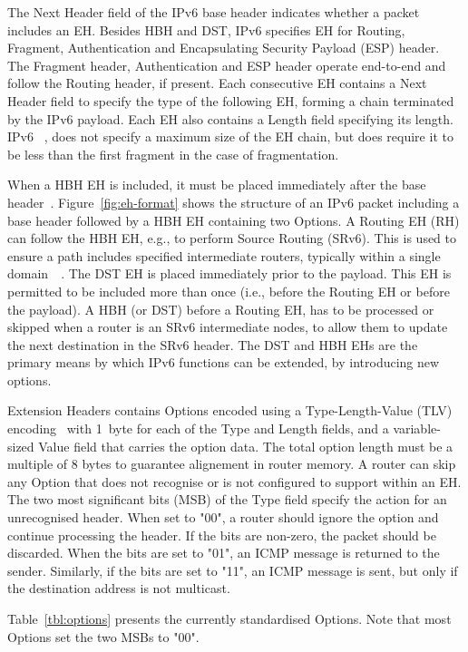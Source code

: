 \documentclass[conference]{IEEEtran}
\begin{document}
The Next Header field of the IPv6 base header indicates whether a packet
includes an EH.  Besides HBH and DST, IPv6 specifies EH for Routing, Fragment,
Authentication and Encapsulating Security Payload (ESP) header.  The Fragment
header, Authentication and ESP header operate end-to-end and follow the Routing
header, if present.  Each consecutive EH contains a Next Header field to
specify the type of the following EH, forming a chain terminated by the IPv6
payload. Each EH also contains a Length field specifying its length.  IPv6
~\cite{RFC8200}, does not specify a maximum size of the EH chain, but does
require it to be less than the first fragment in the case of fragmentation. 

When a HBH EH is included, it must be placed immediately after the base
header~\cite{RFC8200}.  Figure~\ref{fig:eh-format} shows the structure of an
IPv6 packet including a base header followed by a HBH EH containing two
Options.  A Routing EH (RH) can follow the HBH EH, e.g., to perform Source
Routing (SRv6). This is used  to ensure a path includes specified intermediate
routers, typically within a single domain~\cite{srv6}~\cite{srperf}. The DST EH
is placed immediately prior to the payload. This EH is permitted to be included
more than once (i.e.,  before the Routing EH or before the payload).  A HBH (or
DST)  before a Routing EH, has to be processed or skipped when a router is an
SRv6 intermediate nodes, to allow them to update the next destination in the
SRv6 header.  The DST and HBH EHs are the primary means by which IPv6 functions
can be extended, by introducing new options. 

Extension Headers contains Options encoded using a Type-Length-Value (TLV)
encoding~\cite{RFC8200} with 1~byte for each of the Type and Length fields, and
a variable-sized Value field that carries the option data. The total option
length must be a multiple of 8 bytes to guarantee alignement in router memory.
A router can skip any Option that does not recognise or is not configured to
support within an EH.  The two most significant bits (MSB) of the Type field specify
the action for an unrecognised header.  When set to "00", a router should
ignore the option and continue processing the header.  If the bits are
non-zero, the packet should be discarded.  When the bits are set to "01", an
ICMP message is returned to the sender. Similarly, if the bits are set to "11",
an ICMP message is sent, but only if the destination address is not multicast.

Table~\ref{tbl:options} presents the currently standardised Options.  Note that
most Options set the two MSBs to "00".
\end{document}
